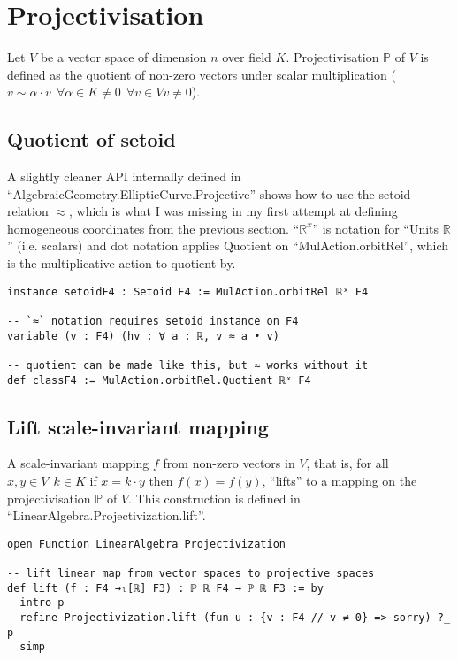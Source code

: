 \documentclass[a4paper, 12pt]{article}
\newcommand{\R}{\mathbb{R}}
\renewcommand{\P}{\mathbb{P}}
\begin{document}
\section*{Projectivisation}

Let $V$ be a vector space of dimension $n$ over field $K$.
Projectivisation $\P$ of $V$ is defined as
the quotient of non-zero vectors under scalar multiplication
($v\sim \alpha\cdot v \:\: \forall \alpha\in K \ne 0\:\: \forall v \in V v \ne 0$).

\subsection*{Quotient of setoid}

A slightly cleaner API internally defined in
``AlgebraicGeometry.EllipticCurve.Projective''
shows how to use the setoid relation $\approx$,
which is what I was missing in my first attempt
at defining homogeneous coordinates from the previous section.
``$\R^x$'' is notation for ``Units $\R$'' (i.e. scalars)
and dot notation applies Quotient on ``MulAction.orbitRel'',
which is the multiplicative action to quotient by.

\begin{lstlisting}
instance setoidF4 : Setoid F4 := MulAction.orbitRel ℝˣ F4

-- `≈` notation requires setoid instance on F4
variable (v : F4) (hv : ∀ a : ℝ, v ≈ a • v)

-- quotient can be made like this, but ≈ works without it
def classF4 := MulAction.orbitRel.Quotient ℝˣ F4
\end{lstlisting}

\subsection*{Lift scale-invariant mapping}

A scale-invariant mapping $f$ from non-zero vectors in $V$,
that is, for all $x,y\in V \:\: k \in K$ if $x=k\cdot y$ then $f(x)=f(y)$,
``lifts'' to a mapping on the projectivisation $\P$ of $V$.
This construction is defined in ``LinearAlgebra.Projectivization.lift''.

\begin{lstlisting}
open Function LinearAlgebra Projectivization

-- lift linear map from vector spaces to projective spaces
def lift (f : F4 →ₗ[ℝ] F3) : ℙ ℝ F4 → ℙ ℝ F3 := by
  intro p
  refine Projectivization.lift (fun u : {v : F4 // v ≠ 0} => sorry) ?_ p
  simp
\end{lstlisting}
\end{document}

